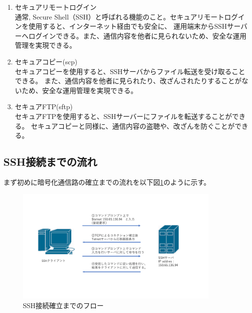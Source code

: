 \documentclass[12pt,a4paper,titlepage]{jreport}
\begin{document}
\begin{enumerate}
    \item セキュアリモートログイン\mbox{}\\通常,
    Secure Shell（SSH）と呼ばれる機能のこと。セキュアリモートログインを使用すると、インターネット経由でも安全に、
    運用端末からSSHサーバーへログインできる。また、通信内容を他者に見られないため、安全な運用管理を実現できる。
    \item セキュアコピー(scp)\mbox{}\\セキュアコピーを使用すると、SSHサーバからファイル転送を受け取ることできる。
    また、通信内容を他者に見られたり、改ざんされたりすることがないため、安全な運用管理を実現できる。
    \item セキュアFTP(sftp)\mbox{}\\セキュアFTPを使用すると、SSHサーバーにファイルを転送することができる。
    セキュアコピーと同様に、通信内容の盗聴や、改ざんを防ぐことができる。
\end{enumerate}



\subsection{SSH接続までの流れ}

まず初めに暗号化通信路の確立までの流れを以下図\ref{SSH_flow}のように示す。
\begin{figure}[h]
    \centering
    \includegraphics[width=0.9\textwidth, page=5]{graphs/network_archtecture.pdf}
    \caption{SSH接続確立までのフロー}
    \label{SSH_flow}
\end{figure}
\end{document}
